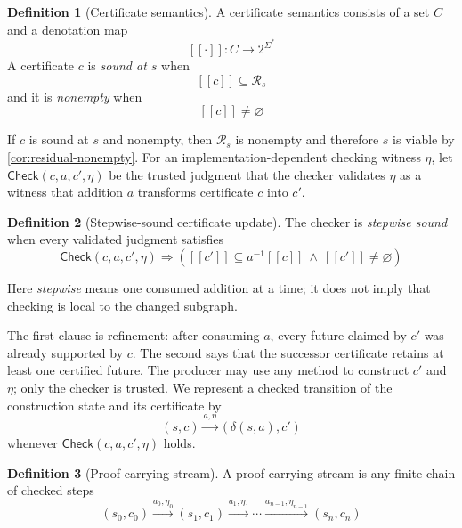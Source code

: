 \documentclass[11pt]{article}
\theoremstyle{definition}
\newtheorem{definition}[definition]{Definition}
\newcommand{\Additions}{\Sigma}
\newcommand{\Residual}{\mathcal R}
\newcommand{\Cert}{C}
\newcommand{\CertCheck}{\mathsf{Check}}
\newcommand{\denote}[1]{\left[\!\left[#1\right]\!\right]}
\begin{document}
\begin{definition}[Certificate semantics]\label{def:certificate-domain}
A certificate semantics consists of a set $\Cert$ and a denotation map
\[
  \denote{\cdot}:\Cert\to 2^{\Additions^*}
\]
A certificate $c$ is \emph{sound at $s$} when
\begin{equation}\label{eq:certificate-sound}
  \denote{c}\subseteq\Residual_s
\end{equation}
and it is \emph{nonempty} when
\begin{equation}\label{eq:certificate-nonempty}
  \denote{c}\ne\varnothing
\end{equation}
\end{definition}

If $c$ is sound at $s$ and nonempty, then $\Residual_s$ is nonempty and therefore $s$ is viable by \cref{cor:residual-nonempty}. For an implementation-dependent checking witness $\eta$, let
$\CertCheck(c,a,c',\eta)$ be the trusted judgment that the checker validates
$\eta$ as a witness that addition $a$ transforms certificate $c$ into $c'$.

\begin{definition}[Stepwise-sound certificate update]\label{def:stepwise-soundness}
The checker is \emph{stepwise sound} when every validated judgment satisfies
\begin{equation}\label{eq:stepwise-soundness}
  \CertCheck(c,a,c',\eta)
  \Longrightarrow
  \left(
    \denote{c'}\subseteq a^{-1}\denote{c}
    \ \land\
    \denote{c'}\ne\varnothing
  \right)
\end{equation}
\end{definition}

Here \emph{stepwise} means one consumed addition at a time; it does not imply that checking is local to the changed subgraph.

The first clause is refinement: after consuming $a$, every future claimed by $c'$ was already supported by $c$. The second says
that the successor certificate retains at least one certified future. The producer may
use any method to construct $c'$ and $\eta$; only the checker is trusted. We represent a checked transition of the construction state and its certificate by
$$ (s,c)\xrightarrow{a,\eta}(\delta(s,a),c') $$
whenever \(\CertCheck(c,a,c',\eta)\) holds.

\begin{definition}[Proof-carrying stream]\label{def:pcs}
A proof-carrying stream is any finite chain of checked steps
\[
  (s_0,c_0)\xrightarrow{a_0,\eta_0}
  (s_1,c_1)\xrightarrow{a_1,\eta_1}\cdots
  \xrightarrow{a_{n-1},\eta_{n-1}}(s_n,c_n)
\]
\end{definition}
\end{document}

